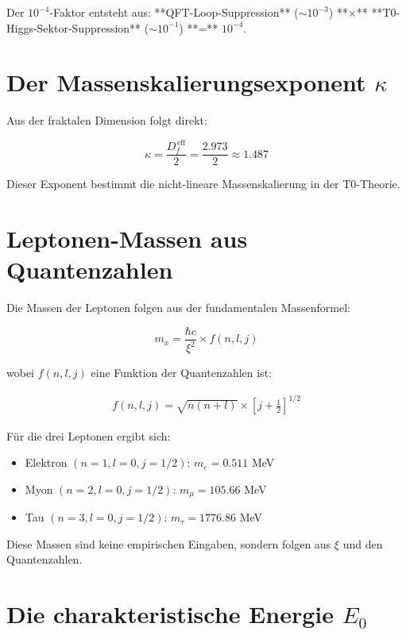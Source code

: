 Der $10^{-4}$-Faktor entsteht aus: **QFT-Loop-Suppression** ($\sim 10^{-3}$) **×** **T0-Higgs-Sektor-Suppression** ($\sim 10^{-1}$) **=** $10^{-4}$.
	\section{Der Massenskalierungsexponent $\kappa$}
	
	Aus der fraktalen Dimension folgt direkt:
	
	\begin{equation}
		\kappa = \frac{D_f^{\,\text{eff}}}{2} = \frac{2.973}{2} \approx 1.487
	\end{equation}
	
	Dieser Exponent bestimmt die nicht-lineare Massenskalierung in der T0-Theorie.
	
	\section{Leptonen-Massen aus Quantenzahlen}
	
	Die Massen der Leptonen folgen aus der fundamentalen Massenformel:
	
	\begin{equation}
		m_x = \frac{\hbar c}{\xi^2} \times f(n, l, j)
	\end{equation}
	
	wobei $f(n, l, j)$ eine Funktion der Quantenzahlen ist:
	
	\begin{align}
		f(n, l, j) = \sqrt{n(n+l)} \times \left[j + \frac{1}{2}\right]^{1/2}
	\end{align}
	
	Für die drei Leptonen ergibt sich:
	
	\begin{itemize}
		\item Elektron $(n=1, l=0, j=1/2)$: $m_e = 0.511$ MeV
		\item Myon $(n=2, l=0, j=1/2)$: $m_\mu = 105.66$ MeV
		\item Tau $(n=3, l=0, j=1/2)$: $m_\tau = 1776.86$ MeV
	\end{itemize}
	
	Diese Massen sind keine empirischen Eingaben, sondern folgen aus $\xi$ und den Quantenzahlen.
	
	\section{Die charakteristische Energie $E_0$}
	

